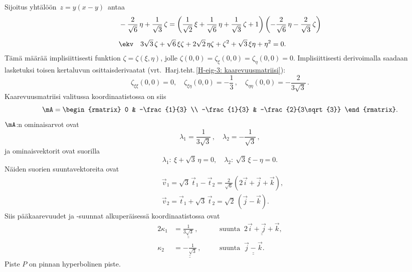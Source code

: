 Sijoitus yhtälöön $\,z=y(x-y)\,$ antaa
\begin{align*}
&-\frac{2}{\sqrt{6}}\,\eta+\frac{1}{\sqrt{3}}\,\zeta
  =\left(\frac{1}{\sqrt{2}}\,\xi+\frac{1}{\sqrt{6}}\,\eta+\frac{1}{\sqrt{3}}\,\zeta+1\right)
   \left(-\frac{2}{\sqrt{6}}\,\eta-\frac{2}{\sqrt{3}}\,\zeta\right) \\[2mm]
&\ekv \quad 3\sqrt{3}\,\zeta+\sqrt{6}\,\xi\zeta+2\sqrt{2}\,\eta\zeta+\zeta^2
            +\sqrt{3}\,\xi\eta+\eta^2=0.
\end{align*}
Tämä määrää implisiittisesti funktion $\zeta=\zeta(\xi,\eta)$, jolle 
$\zeta(0,0)=\zeta_\xi(0,0)=\zeta_\eta(0,0)=0$. Implisiittisesti derivoimalla saadaan lasketuksi
toisen kertaluvun osittaisderivaatat (vrt.\ Harj.teht.\,\ref{H-eig-3: kaarevuusmatriisi}):
\[
\zeta_{\xi\xi}(0,0)=0,\quad \zeta_{\xi\eta}(0,0)=-\frac{1}{3}\,,\quad 
\zeta_{\eta\eta}(0,0)=-\frac{2}{3\sqrt{3}}\,.
\]
Kaarevuusmatriisi valitussa koordinaatistossa on siis
\[
\mA=\begin{rmatrix} 0 & -\frac{1}{3} \\ -\frac{1}{3} & -\frac{2}{3\sqrt{3}} \end{rmatrix}.
\]
$\mA$:n ominaisarvot ovat 
\[
\lambda_1=\frac{1}{3\sqrt{3}}\,, \quad \lambda_2=-\frac{1}{\sqrt{3}}\,,
\]
ja ominaisvektorit ovat suorilla
\[
\lambda_1:\ \xi+\sqrt{3}\,\eta=0, \quad \lambda_2:\ \sqrt{3}\,\xi-\eta=0.
\]
Näiden suorien suuntavektoreita ovat
\begin{align*}
&\vec v_1 = \sqrt{3}\,\vec t_1-\vec t_2 = \frac{2}{\sqrt{6}}(2\vec i+\vec j+\vec k), \\
&\vec v_2 = \vec t_1+\sqrt{3}\,\vec t_2 = \sqrt{2}\,(\vec j-\vec k).
\end{align*}
Siis pääkaarevuudet ja -suunnat alkuperäisessä koordinaatistossa ovat
\begin{alignat*}{2}
\kappa_1 &=\underline{\underline{\frac{1}{3\sqrt{3}}}}\,,\quad 
         &&\text{suunta }\ \underline{\underline{2\vec i+\vec j+\vec k}}, \\
\kappa_2 &=\underline{\underline{-\frac{1}{\sqrt{3}}}}\,,\quad 
         &&\text{suunta }\ \underline{\underline{\vec j-\vec k}}.
\end{alignat*}
Piste $P$ on pinnan hyperbolinen piste. \loppu

